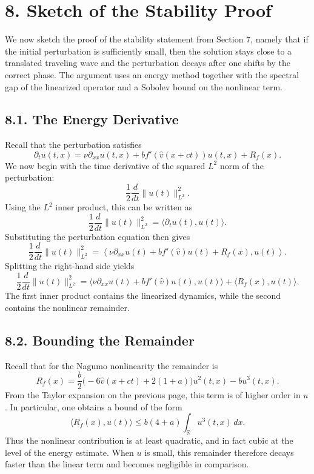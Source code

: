 \documentclass[11pt]{article}
\theoremstyle{definition}
\theoremstyle{remark}
\begin{document}
\section*{8. Sketch of the Stability Proof}
We now sketch the proof of the stability statement from Section 7, namely that if the initial perturbation is sufficiently small, then the solution stays close to a translated traveling wave and the perturbation decays after one shifts by the correct phase. The argument uses an energy method together with the spectral gap of the linearized operator and a Sobolev bound on the nonlinear term.

\subsection*{8.1. The Energy Derivative}
Recall that the perturbation satisfies
\[
\partial_t u(t,x)
=
\nu\partial_{xx}u(t,x)+bf'(\hat v(x+ct))u(t,x)+R_f(x).
\]
We now begin with the time derivative of the squared $L^2$ norm of the perturbation:
\[
\frac12\frac{d}{dt}\|u(t)\|_{L^2}^2.
\]
Using the $L^2$ inner product, this can be written as
\[
\frac12\frac{d}{dt}\|u(t)\|_{L^2}^2
=
\langle \partial_t u(t),u(t)\rangle.
\]
Substituting the perturbation equation then gives
\[
\frac12\frac{d}{dt}\|u(t)\|_{L^2}^2
=
\left\langle \nu\partial_{xx}u(t)+bf'(\hat v)u(t)+R_f(x),u(t)\right\rangle.
\]
Splitting the right-hand side yields
\[
\frac12\frac{d}{dt}\|u(t)\|_{L^2}^2
=
\langle \nu\partial_{xx}u(t)+bf'(\hat v)u(t),u(t)\rangle
+
\langle R_f(x),u(t)\rangle.
\]
The first inner product contains the linearized dynamics, while the second contains the nonlinear remainder.

\subsection*{8.2. Bounding the Remainder}
Recall that for the Nagumo nonlinearity the remainder is
\[
R_f(x)
=
\frac{b}{2}\bigl(-6\hat v(x+ct)+2(1+a)\bigr)u^2(t,x)-bu^3(t,x).
\]
From the Taylor expansion on the previous page, this term is of higher order in $u$. In particular, one obtains a bound of the form
\[
\langle R_f(x),u(t)\rangle
\leq
b(4+a)\int_{\mathbb R} u^3(t,x)\,dx.
\]
Thus the nonlinear contribution is at least quadratic, and in fact cubic at the level of the energy estimate. When $u$ is small, this remainder therefore decays faster than the linear term and becomes negligible in comparison.
\end{document}
